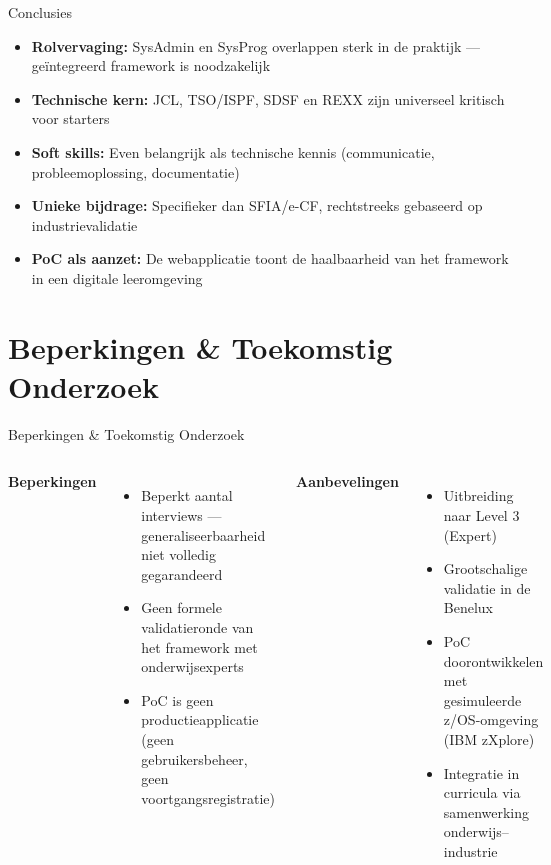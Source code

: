 \documentclass[aspectratio=169]{beamer}
\begin{document}
\begin{frame}{Conclusies}
  \begin{itemize}
    \item \textbf{Rolvervaging:} SysAdmin en SysProg overlappen sterk in de praktijk — geïntegreerd framework is noodzakelijk
    \item \textbf{Technische kern:} JCL, TSO/ISPF, SDSF en REXX zijn universeel kritisch voor starters
    \item \textbf{Soft skills:} Even belangrijk als technische kennis (communicatie, probleemoplossing, documentatie)
    \item \textbf{Unieke bijdrage:} Specifieker dan SFIA/e-CF, rechtstreeks gebaseerd op industrievalidatie
    \item \textbf{PoC als aanzet:} De webapplicatie toont de haalbaarheid van het framework in een digitale leeromgeving
  \end{itemize}
\end{frame}

\section{Beperkingen \& Toekomstig Onderzoek}

\begin{frame}{Beperkingen \& Toekomstig Onderzoek}
  \begin{columns}
      \textbf{Beperkingen}
      \begin{itemize}
        \item Beperkt aantal interviews — generaliseerbaarheid niet volledig gegarandeerd
        \item Geen formele validatieronde van het framework met onderwijsexperts
        \item PoC is geen productieapplicatie (geen gebruikersbeheer, geen voortgangsregistratie)
      \end{itemize}
      \textbf{Aanbevelingen}
      \begin{itemize}
        \item Uitbreiding naar Level 3 (Expert)
        \item Grootschalige validatie in de Benelux
        \item PoC doorontwikkelen met gesimuleerde z/OS-omgeving (IBM zXplore)
        \item Integratie in curricula via samenwerking onderwijs--industrie
      \end{itemize}
  \end{columns}
\end{frame}
\end{document}
